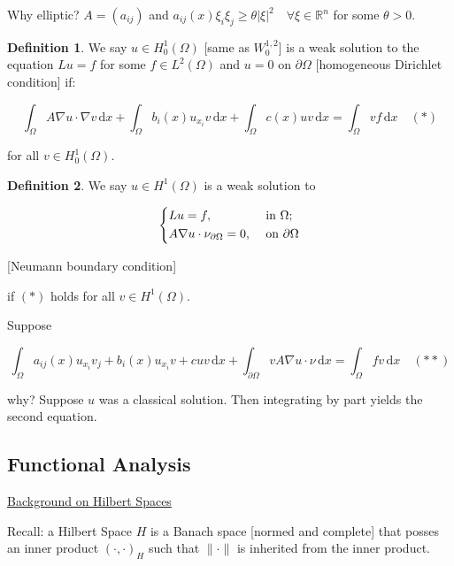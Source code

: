 \documentclass{article}
\theoremstyle{definition}
\newtheorem{definition}{Definition}
\begin{document}
Why elliptic? \(A = (a_{ij})\) and \(a_{ij}(x) \xi_i \xi_j \geq \theta \vert \xi \vert ^2 \quad \forall \xi \in \mathbb{R}^n\) for some \(\theta > 0\).

\begin{definition}
    We say \(u \in H^1_0 (\Omega)\) [same as \(W^{1,2}_0\)] is a weak solution to the equation \(L u = f\) for some \(f\in L^2(\Omega)\) and \(u = 0\) on \(\partial \Omega\) [homogeneous Dirichlet condition] if:

    \[
        \int_{\Omega}^{} A\nabla u \cdot \nabla v \,\mathrm{d}x + \int_{\Omega}^{} b_i(x) u_{x_i} v \,\mathrm{d}x + \int_{\Omega}^{} c(x) uv \,\mathrm{d}x = \int_{\Omega}^{} v f \,\mathrm{d}x \quad (\ast) 
    \]

    for all \(v\in H_0^1(\Omega)\).
\end{definition}

\begin{definition}
    We say \(u\in H^1(\Omega)\) is a weak solution to

    \[
        \begin{dcases}
            L u = f, &\text{ in } \Omega ;\\
            A\nabla u \cdot \nu_{\partial \Omega} = 0, &\text{ on } \partial \Omega
        \end{dcases}
    \]

    [Neumann boundary condition]

    if \((\ast)\) holds for all \(v\in H^1(\Omega)\).
\end{definition}

Suppose

\[
    \int_{\Omega}^{} a_{ij}(x) u_{x_i}v_j + b_i (x) u_{x_i}v + c u v \,\mathrm{d}x + \int_{\partial \Omega}^{} v A \nabla u \cdot \nu \,\mathrm{d}x = \int_{\Omega}^{} f v \,\mathrm{d}x \quad (\ast\ast) 
\]

why? Suppose \(u\) was a classical solution. Then integrating by part yields the second equation.

\subsection*{Functional Analysis}

\underline{Background on Hilbert Spaces}

Recall: a Hilbert Space \(H\) is a Banach space [normed and complete] that posses an inner product \((\cdot,\cdot)_H\) such that \(\lVert \cdot \rVert \) is inherited from the inner product.
\end{document}
